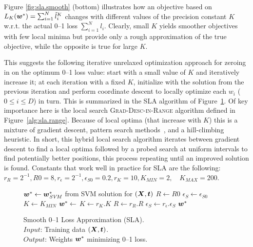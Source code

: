 Figure \ref{fig:sla.smooth} (bottom) illustrates how an objective
based on $L_K(\boldsymbol{w}^*) = \sum_{i=1}^N \tilde{l}_i^K$ changes with
different values of the precision constant $K$ w.r.t. the actual 0--1
loss $\sum_{i=1}^N l_i$.  Clearly, small $K$ yields smoother
objectives with few local minima but provide only a rough
approximation of the true objective, while the opposite is true for
large $K$.

This suggests the following iterative unrelaxed optimization approach
for zeroing in on the optimum 0--1 loss value: start with a small
value of $K$ and iteratively increase it; at each iteration with a
fixed $K$, initialize with the solution from the previous iteration
and perform coordinate descent to locally optimize each $w_i$ ($0 \leq
i \leq D$) in turn.  This is summarized in the SLA algorithm of
Figure~\ref{alg:sla.algorithm}.  Of key importance here is the local
search \textsc{Grad-Desc-in-Range} algorithm defined in
Figure~\ref{alg:sla.range}.  Because of local optima (that increase
with $K$) this is a mixture of gradient descent, pattern search
methods~\cite{Hooke}, and a hill-climbing heuristic.  In short, this
hybrid local search algorithm iterates between gradient descent to
find a local optima followed by a probed search at uniform intervals
to find potentially better positions, this process repeating until 
an improved solution is found.  Constants that work well in practice
for SLA are the following: $r_R = 2^{-1}, R0 = 8, r_\epsilon = 2^{-1}, 
\epsilon_{S0} = 0.2, r_K = 10, K_{MIN} = 2, \quad K_{MAX} = 200$.

\begin{figure}
\vspace{-3mm}
\caption{
Smooth 0--1 Loss Approximation (SLA). \\
\text{\hspace{1.4cm}} $Input$: Training data $(\boldsymbol{X},\boldsymbol{t})$. \\
\text{\hspace{1.4cm}} $Output$: Weights $\boldsymbol{w}^*$ minimizing 0--1 loss.
}
\label{alg:sla.algorithm}
{\footnotesize
\begin{algorithmic}[1]
 
   \State $\boldsymbol{w}^* \gets \boldsymbol{w}^*_{\mathit{SVM}}$ from SVM solution for $(\boldsymbol{X},\boldsymbol{t})$
   \State $R \gets R0$
   \State $\epsilon_S \gets \epsilon_{S0}$
   \State $K \gets K_{MIN}$
      \State $\boldsymbol{w}^* \gets$ 
      \State $K \gets r_K.K$
      \State $R \gets r_R.R$
      \State $\epsilon_S \gets r_\epsilon.\epsilon_S$
   \EndWhile
   \State \Return $\boldsymbol{w}^*$
\EndFunction
\end{algorithmic}}
\vspace{-4mm}
\end{figure}

